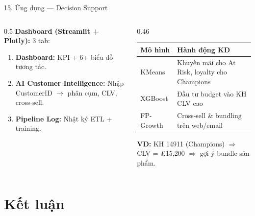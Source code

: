 \documentclass[10pt, aspectratio=169]{beamer}
\begin{document}
\begin{frame}{15. Ứng dụng --- Decision Support}
    \small
    \begin{columns}[T]
        \begin{column}{0.5\textwidth}
            \textbf{Dashboard (Streamlit + Plotly):} 3 tab:
            \begin{enumerate}
                \item \textbf{Dashboard:} KPI + 6+ biểu đồ tương tác.
                \item \textbf{AI Customer Intelligence:} Nhập CustomerID $\to$ phân cụm, CLV, cross-sell.
                \item \textbf{Pipeline Log:} Nhật ký ETL + training.
            \end{enumerate}
        \end{column}
        
        \begin{column}{0.46\textwidth}
            \footnotesize
            \begin{tabularx}{\linewidth}{lX}
                \toprule
                \textbf{Mô hình} & \textbf{Hành động KD} \\
                \midrule
                KMeans & Khuyến mãi cho At Risk, loyalty cho Champions \\
                \midrule
                XGBoost & Đầu tư budget vào KH CLV cao \\
                \midrule
                FP-Growth & Cross-sell \& bundling trên web/email \\
                \bottomrule
            \end{tabularx}
            
            \small
            \vspace{0.15cm}
            \textbf{VD:} KH 14911 (Champions) $\Rightarrow$ CLV = £15,200 $\Rightarrow$ gợi ý bundle sản phẩm.
        \end{column}
    \end{columns}
\end{frame}

\section{Kết luận}
\end{document}

